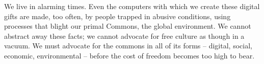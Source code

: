We live in alarming times. Even the computers with which we create these
digital gifts are made, too often, by people trapped in abusive
conditions, using processes that blight our primal Commons, the global
environment. We cannot abstract away these facts; we cannot advocate for
free culture as though in a vacuum. We must advocate for the commons in
all of its forms -- digital, social, economic, environmental -- before
the cost of freedom becomes too high to bear.
